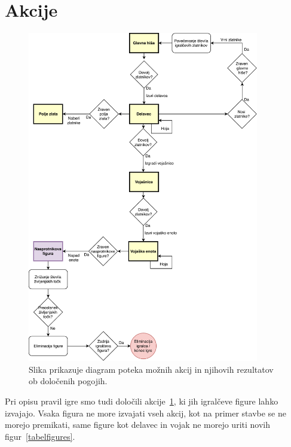 \documentclass[a4paper, 12pt]{book}
\begin{document}
\section{Akcije}

\begin{figure}[h!]
	\begin{center}
		\includegraphics[width=0.9\textwidth]{photos/prikazAkcij.pdf}
	\end{center}
	\caption{Slika prikazuje diagram poteka možnih akcij in njihovih rezultatov ob določenih pogojih.}
	\label{picActions}
\end{figure}

Pri opisu pravil igre smo tudi določili akcije~\ref{picActions}, ki jih igralčeve figure lahko izvajajo. 
Vsaka figura ne more izvajati vseh akcij, kot na primer stavbe se ne morejo premikati, same figure kot delavec in vojak ne morejo uriti novih figur~\ref{tabelfigures}.
\end{document}

